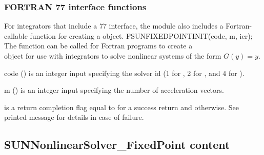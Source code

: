 \subsubsection*{FORTRAN 77 interface functions}
For {\sundials} integrators that include a {\F} 77 interface, the
{\sunnonlinsolfixedpoint} module also includes a Fortran-callable
function for creating a  object.
%
%
{
  FSUNFIXEDPOINTINIT(code, m, ier);
}
{
  The function  can be called for Fortran programs
  to create a\\
   object for use with {\sundials}
  integrators to solve nonlinear systems of the form $G(y) = y$.
}
{
  \begin{args}[code]
  \item[code] ()
    is an integer input specifying the solver id (1 for {\cvode}, 2
    for {\ida}, and 4 for {\arkode}).
  \item[m] ()
    is an integer input specifying the number of acceleration vectors.
  \end{args}
}
{
   is a return completion flag equal to  for a success
  return and  otherwise. See printed message for details in case
  of failure.
}
{}


\subsection{SUNNonlinearSolver\_FixedPoint content}
\label{ss:sunnonlinsolfixedpoint_content}

